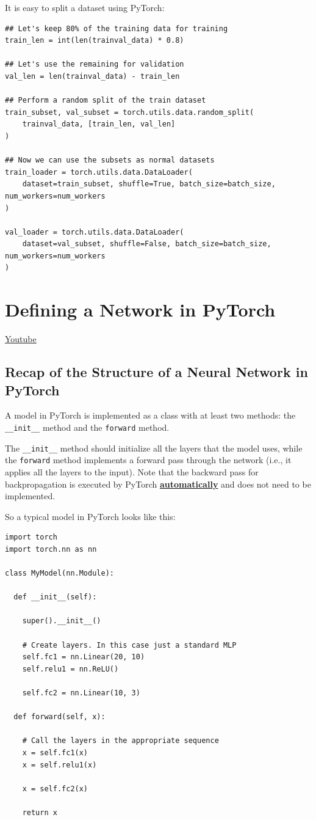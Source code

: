 It is easy to split a dataset using PyTorch:

\begin{lstlisting}
## Let's keep 80% of the training data for training
train_len = int(len(trainval_data) * 0.8)

## Let's use the remaining for validation
val_len = len(trainval_data) - train_len

## Perform a random split of the train dataset
train_subset, val_subset = torch.utils.data.random_split(
    trainval_data, [train_len, val_len]
)

## Now we can use the subsets as normal datasets
train_loader = torch.utils.data.DataLoader(
    dataset=train_subset, shuffle=True, batch_size=batch_size, num_workers=num_workers
)

val_loader = torch.utils.data.DataLoader(
    dataset=val_subset, shuffle=False, batch_size=batch_size, num_workers=num_workers
)
\end{lstlisting}
\section{Defining a Network in PyTorch}
\href{https://www.youtube.com/watch?v=nM-J4eAb-pI&t=1s&ab_channel=Udacity}{Youtube} \newline

\subsection{Recap of the Structure of a Neural Network in PyTorch}

A model in PyTorch is implemented as a class with at least two methods: the \verb|__init__| method and the \verb|forward| method. \newline

The \verb|__init__| method should initialize all the layers that the model uses, while the \verb|forward| method implements a forward pass through the network (i.e., it applies all the layers to the input). Note that the backward pass for backpropagation is executed by PyTorch \href{https://pytorch.org/tutorials/beginner/blitz/autograd_tutorial.html}{\textbf{automatically}} and does not need to be implemented. \newline

So a typical model in PyTorch looks like this:
\begin{lstlisting}
import torch
import torch.nn as nn

class MyModel(nn.Module):

  def __init__(self):

    super().__init__()

    # Create layers. In this case just a standard MLP
    self.fc1 = nn.Linear(20, 10)
    self.relu1 = nn.ReLU()

    self.fc2 = nn.Linear(10, 3)

  def forward(self, x):

    # Call the layers in the appropriate sequence
    x = self.fc1(x)
    x = self.relu1(x)

    x = self.fc2(x)

    return x
\end{lstlisting}

